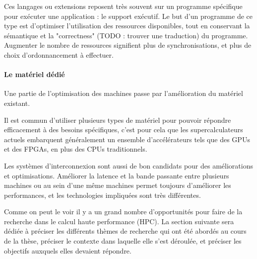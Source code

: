 Ces langages ou extensions reposent très souvent sur un programme spécifique pour exécuter une application : le support exécutif.
Le but d'un programme de ce type est d'optimiser l'utilisation des ressources disponibles, tout en conservant la sémantique et la "correctness" (TODO : trouver une traduction) du programme.
Augmenter le nombre de ressources signifient plus de synchronisations, et plus de choix d'ordonnancement à effectuer.

\paragraph{Le matériel dédié}

Une partie de l'optimisation des machines passe par l'amélioration du matériel existant.

Il est commun d'utiliser plusieurs types de matériel pour pouvoir répondre efficacement à des besoins spécifiques, c'est pour cela que les supercalculateurs actuels embarquent généralement un ensemble d'accélérateurs tels que des GPUs et des FPGAs, en plus des CPUs traditionnels.

Les systèmes d'interconnexion sont aussi de bon candidats pour des améliorations et optimisations.
Améliorer la latence et la bande passante entre plusieurs machines ou au sein d'une même machines permet toujours d'améliorer les performances, et les technologies impliquées sont très différentes.



Comme on peut le voir il y a un grand nombre d'opportunités pour faire de la recherche dans le calcul haute performance (HPC).
La section suivante sera dédiée à préciser les différents thèmes de recherche qui ont été abordés au cours de la thèse, préciser le contexte dans laquelle elle s'est déroulée, et préciser les objectifs auxquels elles devaient répondre.





